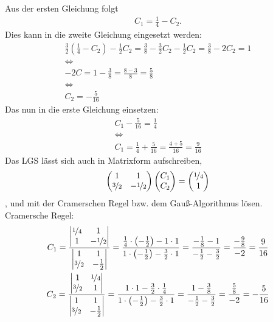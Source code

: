 \documentclass[11pt,a4paper,DIV=12]{scrartcl}
\begin{document}
%
Aus der ersten Gleichung folgt 
%
\begin{gather}
	C_1=\frac{1}{4}-C_2.
\end{gather}
%
Dies kann in die zweite Gleichung eingesetzt werden:
%
%
\begin{gather}
	\frac{3}{2}(\frac{1}{4}-C_2)-\frac{1}{2}C_2=\frac{3}{8}-\frac{3}{2}C_2-\frac{1}{2}C_2=\frac{3}{8}-2C_2=1\\
	\Longleftrightarrow\\
	-2C=1-\frac{3}{8}=\frac{8-3}{8}=\frac{5}{8}\\
	\Longleftrightarrow\nonumber\\
	C_2=-\frac{5}{16}
\end{gather}
%
%
Das nun in die erste Gleichung einsetzen:
%
\begin{gather}
	C_1-\frac{5}{16}=\frac{1}{4}\\
	\Longleftrightarrow\nonumber\\
	C_1=\frac{1}{4}+\frac{5}{16}=\frac{4+5}{16}=\frac{9}{16}
\end{gather}
%
Das LGS lässt sich auch in Matrixform aufschreiben,
%
%
\begin{gather}
	\begin{pmatrix}
		1 & 1 \\
		\nicefrac{3}{2} & -\nicefrac{1}{2}
	\end{pmatrix}
	\begin{pmatrix}
		C_1 \\
		C_2
	\end{pmatrix}
	=
	\begin{pmatrix}
		\nicefrac{1}{4} \\
		1
	\end{pmatrix}
\end{gather}
%
%
, und mit der Cramerschen Regel bzw. dem Gauß-Algorithmus lösen.\\
%
Cramersche Regel:
%
\begin{gather}
	C_1=
	\frac{
		\begin{vmatrix}
			\nicefrac{1}{4} & 1\\
			1 & -\nicefrac{1}{2}
		\end{vmatrix}
	}
	{
		\begin{vmatrix}
			1 & 1 \\
			\nicefrac{3}{2} & -\frac{1}{2}
		\end{vmatrix}
	}
	=
	\frac{\frac{1}{4}\cdot\left(-\frac{1}{2}\right)-1\cdot 1}
	{1\cdot\left(-\frac{1}{2}\right)-\frac{3}{2}\cdot1}
	=\frac{-\frac{1}{8}-1}{-\frac{1}{2}-\frac{3}{2}}=\frac{-\frac{9}{8}}{-2}=\frac{9}{16}\\
	C_2=
	\frac{
		\begin{vmatrix}
			1 & \nicefrac{1}{4}\\
			\nicefrac{3}{2} & 1
		\end{vmatrix}
	}
	{
		\begin{vmatrix}
			1 & 1 \\
			\nicefrac{3}{2} & -\frac{1}{2}
		\end{vmatrix}
	}
	=
	\frac{1\cdot 1-\frac{3}{2}\cdot\frac{1}{4}}
	{1\cdot\left(-\frac{1}{2}\right)-\frac{3}{2}\cdot1}
	=\frac{1-\frac{3}{8}}{-\frac{1}{2}-\frac{3}{2}}=\frac{\frac{5}{8}}{-2}=-\frac{5}{16}
\end{gather}
\end{document}
